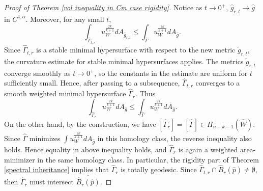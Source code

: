 \documentclass[11pt]{amsart}
\theoremstyle{definition}
\theoremstyle{remark}
\numberwithin{equation}{section}
\begin{document}
\begin{proof}[Proof of Theorem \ref{vol inequality in Cm case rigidity}]
        Notice as $t\rightarrow 0^+$,  $\hat{g}_{r,t}\rightarrow \hat{g}$ in $C^{4,\alpha}$.
          Moreover, for any small $t$,
        \[\int_{\hat{\Gamma}_{t,r}}u_{W}^{\frac{2k}{k+1}} dA_{\hat{g}_{r,t}}\leq
          \int_{\hat{\Gamma}}u_{W}^{\frac{2k}{k+1}} dA_{\hat{g}}. \]
        Since $\hat{\Gamma}_{t,r}$ is a stable minimal hypersurface with respect to the new
          metric $\tilde g_{r,t}$, the curvature estimate for stable minimal hypersurfaces applies.
          The metrics $\tilde g_{r,t}$ converge smoothly as $t\rightarrow0^+$, so the constants in
          the estimate are uniform for $t$ sufficiently small. Hence, after passing to a subsequence,
          $\hat{\Gamma}_{t,r}$ converges to a smooth weighted minimal hypersurface
          $\hat{\Gamma}_{r}$.
        Thus
        \[\int_{\hat{\Gamma}_{r}}u_{W}^{\frac{2k}{k+1}} dA_{\hat{g}}\leq
          \int_{\hat{\Gamma}}u_{W}^{\frac{2k}{k+1}} dA_{\hat{g}}.\]
        On the other hand, by the construction, we have
          $[\hat{\Gamma}_{r}]=[\hat{\Gamma}]\in H_{n-k-1}(\hat{W})$. Since $\hat{\Gamma}$ minimizes
          $\int u_W^{\frac{2k}{k+1}}dA_{\hat g}$ in this homology class, the reverse inequality also
          holds. Hence equality in above inequality holds, and $\hat{\Gamma}_r$ is again a weighted area-minimizer in
          the same homology class. In particular,
          the rigidity part of Theorem \ref{spectral inheritance} implies that
          $\hat{\Gamma}_{r}$ is totally geodesic. Since
          $\hat{\Gamma}_{t,r}\cap \hat{B}_{r}(\hat{p})\neq \emptyset$, then
          $\hat{\Gamma}_{r}$ must intersect $\overline{\hat{B}_{r}(\hat{p})}$. 


\end{proof}
\end{document}
